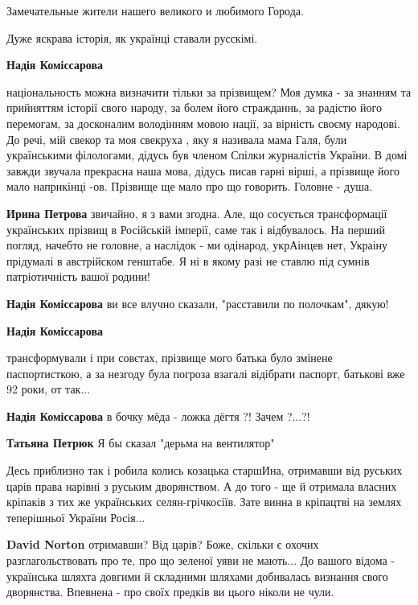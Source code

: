 \begin{itemize}
Замечательные жители нашего великого и любимого Города.

Дуже яскрава історія, як українці ставали русскімі.

\begin{itemize} %
\textbf{Надія Коміссарова} 

національность можна визначити тільки за прізвищем? Моя думка - за знанням та
прийняттям історії свого народу, за болем його стражданнь, за радістю його
перемогам, за досконалим володінням мовою нації, за вірність своєму народові.
До речі, мій свекор та моя свекруха , яку я називала мама Галя, були
українськими філологами, дідусь був членом Спілки журналістів України. В домі
завжди звучала прекрасна наша мова, дідусь писав гарні вірші, а прізвище його
мало наприкінці -ов. Прізвище ще мало про що говорить. Головне - душа.

\begin{itemize} %
\textbf{Ирина Петрова} звичайно, я з вами згодна.
Але, що сосується трансформації українських прізвищ в Російській імперії, саме так і відбувалось.
На перший погляд, начебто не головне, а наслідок - ми одінарод, укрАінцев нет, Украіну прідумалі в австрійском генштабе.
Я ні в якому разі не ставлю під сумнів патріотичність вашої родини!

\textbf{Надія Коміссарова} ви все влучно сказали, "расставили по полочкам", дякую!

\textbf{Надія Коміссарова} 

трансформували і при совєтах, прізвище мого батька було змінене паспортисткою, а
за незгоду була погроза взагалі відібрати паспорт, батькові вже 92 роки, от
так...

\end{itemize} %

\textbf{Надія Коміссарова} в бочку мёда - ложка дёгтя ?! Зачем ?...?!

\textbf{Татьяна Петрюк} Я бы сказал "дерьма на вентилятор"


Десь приблизно так і робила колись козацька старшИна, отримавши від руських
царів права нарівні з руським дворянством. А до того - ще й отримала власних
кріпаків з тих же українських селян-грічкосіїв. Зате винна в кріпацтві на
землях теперішньої України Росія...

\begin{itemize} %
\textbf{David Norton} отримавши? Від царів? Боже, скільки є охочих разглагольствовать про те, про що зеленої уяви не мають...
До вашого відома - українська шляхта довгими й складними шляхами добивалась визнання свого дворянства.
Впевнена - про своїх предків ви цього ніколи не чули.


\end{itemize}
\end{itemize}
\end{itemize}
